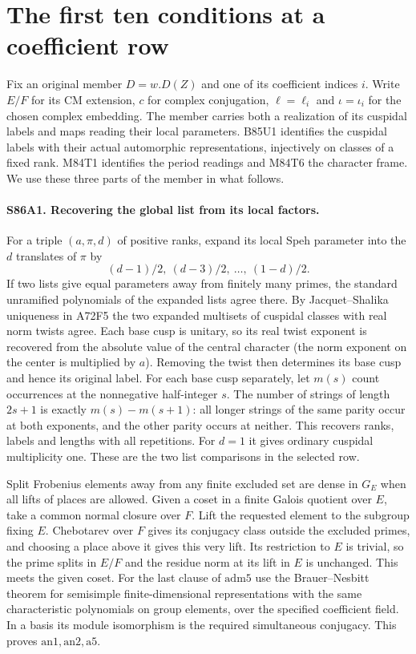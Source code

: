 \section{The first ten conditions at a coefficient row}

Fix an original member $D=w.D(Z)$ and one of its coefficient indices $i$.
Write $E/F$ for its CM extension, $c$ for complex conjugation,
$\ell=\ell_i$ and $\iota=\iota_i$ for the chosen complex embedding.
The member carries both a realization of its cuspidal labels and maps reading
their local parameters. B85U1 identifies the cuspidal labels with their
actual automorphic representations, injectively on classes of a fixed rank.
M84T1 identifies the period readings and M84T6 the character frame.
We use these three parts of the member in what follows.

\paragraph{S86A1. Recovering the global list from its local factors.}
For a triple $(a,\pi,d)$ of positive ranks, expand its local
Speh parameter into the $d$ translates of $\pi$ by
\[
              (d-1)/2,\ (d-3)/2,\ \ldots,\ (1-d)/2.
\]
If two lists give equal parameters away from finitely many primes, the
standard unramified polynomials of the expanded lists agree there.
By Jacquet--Shalika uniqueness in A72F5 the two expanded multisets of
cuspidal classes with real norm twists agree. Each base cusp is unitary,
so its real twist exponent is recovered from the absolute value of the
central character (the norm exponent on the center is multiplied by
$a$). Removing the twist then determines its base cusp and hence its
original label. For each base cusp separately, let $m(s)$ count
occurrences at the nonnegative half-integer $s$. The number of strings
of length $2s+1$ is exactly $m(s)-m(s+1)$: all longer strings of
the same parity occur at both exponents, and the other parity occurs
at neither. This recovers ranks, labels and lengths with all repetitions.
For $d=1$ it gives ordinary cuspidal multiplicity one.
These are the two list comparisons in the selected row.

Split Frobenius elements away from any finite excluded set are dense in
$G_E$ when all lifts of places are allowed. Given a coset in a finite
Galois quotient over $E$, take a common normal closure over $F$. Lift
the requested element to the subgroup fixing $E$. Chebotarev over $F$
gives its conjugacy class outside the excluded primes, and choosing a
place above it gives this very lift. Its restriction to $E$ is trivial,
so the prime splits in $E/F$ and the residue norm at its lift in $E$
is unchanged. This meets the given coset. For the last clause of
$\mathrm{adm5}$ use the Brauer--Nesbitt theorem for semisimple
finite-dimensional representations with the same characteristic
polynomials on group elements, over the specified coefficient field.
In a basis its module isomorphism is the required simultaneous
conjugacy. This proves $\mathrm{an1},\mathrm{an2},\mathrm{a5}$.

